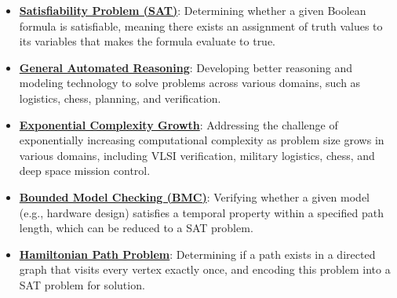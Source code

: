 \documentclass{article}%
\begin{document}
\begin{itemize}[leftmargin=*]%
\item \href{https://purdue.brightspace.com/d2l/common/assets/pdfjs-d2l-dist/1.0.14-legacy/web/viewer.html?file=\%2Fcontent\%2Fenforced\%2F1095467-wl.202510.CS.24300.001\%2F15L2-SAT.pdf\%3Fou\%3D1095467\&lang=en-us\&container=d2l-fileviewer-rendered-pdf\&fullscreen=d2l-fileviewer-rendered-pdf-dialog\&height=667#page=2}{\textbf{Satisfiability Problem (SAT)}}: Determining whether a given Boolean formula is satisfiable, meaning there exists an assignment of truth values to its variables that makes the formula evaluate to true.%
\item \href{https://purdue.brightspace.com/d2l/common/assets/pdfjs-d2l-dist/1.0.14-legacy/web/viewer.html?file=\%2Fcontent\%2Fenforced\%2F1095467-wl.202510.CS.24300.001\%2F15L2-SAT.pdf\%3Fou\%3D1095467\&lang=en-us\&container=d2l-fileviewer-rendered-pdf\&fullscreen=d2l-fileviewer-rendered-pdf-dialog\&height=667#page=3}{\textbf{General Automated Reasoning}}: Developing better reasoning and modeling technology to solve problems across various domains, such as logistics, chess, planning, and verification.%
\item \href{https://purdue.brightspace.com/d2l/common/assets/pdfjs-d2l-dist/1.0.14-legacy/web/viewer.html?file=\%2Fcontent\%2Fenforced\%2F1095467-wl.202510.CS.24300.001\%2F15L2-SAT.pdf\%3Fou\%3D1095467\&lang=en-us\&container=d2l-fileviewer-rendered-pdf\&fullscreen=d2l-fileviewer-rendered-pdf-dialog\&height=667#page=4}{\textbf{Exponential Complexity Growth}}: Addressing the challenge of exponentially increasing computational complexity as problem size grows in various domains, including VLSI verification, military logistics, chess, and deep space mission control.%
\item \href{https://purdue.brightspace.com/d2l/common/assets/pdfjs-d2l-dist/1.0.14-legacy/web/viewer.html?file=\%2Fcontent\%2Fenforced\%2F1095467-wl.202510.CS.24300.001\%2F15L2-SAT.pdf\%3Fou\%3D1095467\&lang=en-us\&container=d2l-fileviewer-rendered-pdf\&fullscreen=d2l-fileviewer-rendered-pdf-dialog\&height=667#page=6}{\textbf{Bounded Model Checking (BMC)}}: Verifying whether a given model (e.g., hardware design) satisfies a temporal property within a specified path length, which can be reduced to a SAT problem.%
\item \href{https://purdue.brightspace.com/d2l/common/assets/pdfjs-d2l-dist/1.0.14-legacy/web/viewer.html?file=\%2Fcontent\%2Fenforced\%2F1095467-wl.202510.CS.24300.001\%2F15L2-SAT.pdf\%3Fou\%3D1095467\&lang=en-us\&container=d2l-fileviewer-rendered-pdf\&fullscreen=d2l-fileviewer-rendered-pdf-dialog\&height=667#page=40}{\textbf{Hamiltonian Path Problem}}: Determining if a path exists in a directed graph that visits every vertex exactly once, and encoding this problem into a SAT problem for solution.%

\end{itemize}
\end{document}
